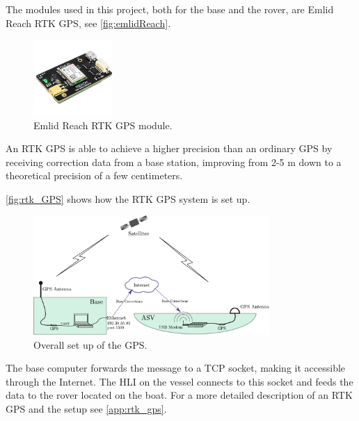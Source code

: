 The modules used in this project, both for the base and the rover, are Emlid Reach RTK GPS, see \autoref{fig:emlidReach}.

\begin{figure}[H]
  \includegraphics[width=0.27\textwidth]{figures/emlidReach}
  \caption{Emlid Reach RTK GPS module.\cite{EmlidReachDocs}}
  \label{fig:emlidReach}
\end{figure}


An RTK GPS is able to achieve a higher precision than an ordinary GPS by receiving correction data from a base station, improving from 2-5 m down to a theoretical precision of a few centimeters. \cite{EmlidRTK}


\autoref{fig:rtk_GPS} shows how the RTK GPS system is set up. 

\begin{figure}[H]
	\includegraphics[width=0.8\textwidth]{figures/comunicationSetup.pdf}
	\caption{Overall set up of the GPS.}
	\label{fig:rtk_GPS}
\end{figure}

The base computer forwards the message to a TCP socket, making it accessible through the Internet. The HLI on the vessel connects to this socket and feeds the data to the rover located on the boat. For a more detailed description of an RTK GPS and the setup see \autoref{app:rtk_gps}.
